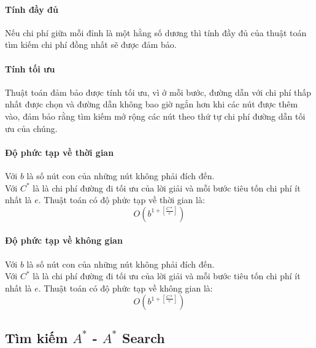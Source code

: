 \documentclass{article}
\begin{document}
\paragraph{Tính đầy đủ}
Nếu chi phí giữa mỗi đỉnh là một hằng số dương thì tính đầy đủ của thuật toán tìm kiếm chi phí đồng nhất sẽ được đảm bảo.

\paragraph{Tính tối ưu}
Thuật toán đảm bảo được tính tối ưu, vì ở mỗi bước, đường dẫn với chi phí thấp nhất được chọn và đường dẫn không bao giờ ngắn hơn khi các nút được thêm vào, đảm bảo rằng tìm kiếm mở rộng các nút theo thứ tự chi phí đường dẫn tối ưu của chúng.

\paragraph{Độ phức tạp về thời gian}
Với $b$ là số nút con của những nút không phải đích đến.\\
Với $C^{*}$ là là chi phí đường đi tối ưu của lời giải và mỗi bước tiêu tốn chi phí ít nhất là $e$. Thuật toán có độ phức tạp về thời gian là: \\
$$O(b^{1 + [\frac{C*}{e}]})$$

\paragraph{Độ phức tạp về không gian}
Với $b$ là số nút con của những nút không phải đích đến.\\
Với $C^{*}$ là là chi phí đường đi tối ưu của lời giải và mỗi bước tiêu tốn chi phí ít nhất là $e$. Thuật toán có độ phức tạp về không gian là: \\
$$O(b^{1 + [\frac{C*}{e}]})$$

\subsection{Tìm kiếm $A^{*}$ - $A^{*}$ Search}
\end{document}
